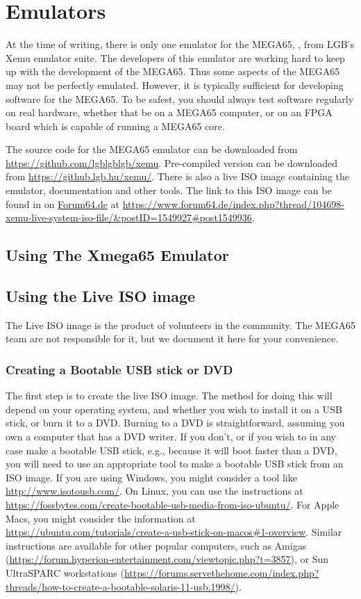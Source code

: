 \chapter{Emulators}

At the time of writing, there is only one emulator for the MEGA65, , from
LGB's Xemu emulator suite. The developers of this emulator are working hard to keep up
with the development of the MEGA65. Thus some aspects of the MEGA65 may not be perfectly
emulated. However, it is typically sufficient for developing software for the MEGA65.
To be safest, you should always test software regularly on real hardware, whether that
be on a MEGA65 computer, or on an FPGA board which is capable of running a MEGA65 core.

The source code for the MEGA65 emulator can be
downloaded from \url{https://github.com/lgblgblgb/xemu}.
Pre-compiled version can be downloaded from \url{https://github.lgb.hu/xemu/}.
There is also a live ISO image containing the emulator, documentation and
other tools.  The link to this ISO image can be found in on \url{Forum64.de}
at \url{https://www.forum64.de/index.php?thread/104698-xemu-live-system-iso-file/\&postID=1549927\#post1549936}.

\section{Using The Xmega65 Emulator}

\section{Using the Live ISO image}

The Live ISO image is the product of volunteers in the community. The MEGA65
team are not responsible for it, but we document it here for your convenience.

\subsection{Creating a Bootable USB stick or DVD}

The first step is to create the live ISO image.  The method for doing
this will depend on your operating system, and whether you wish to install
it on a USB stick, or burn it to a DVD.  Burning to a DVD is straightforward,
assuming you own a computer that has a DVD writer.  If you don't, or if you
wish to in any case make a bootable USB stick, e.g., because it will boot
faster than a DVD, you will need to use an appropriate tool to make a bootable
USB stick from an ISO image.  If you are using Windows, you might consider
a tool like \url{http://www.isotousb.com/}.  On Linux, you can use the instructions
at \url{https://fossbytes.com/create-bootable-usb-media-from-iso-ubuntu/}.
For Apple Macs, you might consider the information at
\url{https://ubuntu.com/tutorials/create-a-usb-stick-on-macos#1-overview}.
Similar instructions are available for other popular computers, such as Amigas (\url{https://forum.hyperion-entertainment.com/viewtopic.php?t=3857}), or Sun UltraSPARC workstations (\url{https://forums.servethehome.com/index.php?threads/how-to-create-a-bootable-solaris-11-usb.1998/}).


